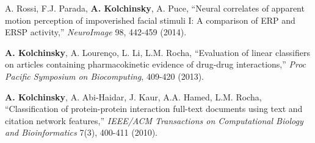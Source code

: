 A. Rossi, F.J. Parada, \textbf{A. Kolchinsky}, A. Puce, ``Neural correlates of apparent motion perception of impoverished facial stimuli I: A comparison of ERP and ERSP activity,'' \emph{NeuroImage} 98, 442-459 (2014).  


\textbf{A. Kolchinsky}, A. Lourenço, L. Li, L.M. Rocha, ``Evaluation of linear classifiers on articles containing pharmacokinetic evidence of drug-drug interactions,'' \emph{Proc Pacific Symposium on Biocomputing}, 409-420 (2013).  

\textbf{A. Kolchinsky}, A. Abi-Haidar, J. Kaur, A.A. Hamed, L.M. Rocha, ``Classification of protein-protein interaction full-text documents using text and citation network features,'' \emph{IEEE/ACM Transactions on Computational Biology and Bioinformatics} 7(3), 400-411 (2010). 
 
